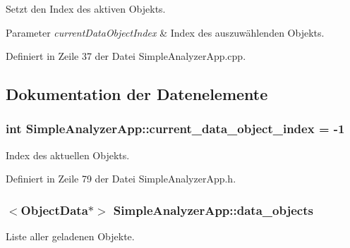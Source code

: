 Setzt den Index des aktiven Objekts. 


\begin{DoxyParams}{Parameter}
{\em current\-Data\-Object\-Index} & Index des auszuwählenden Objekts. \\
\hline
\end{DoxyParams}


Definiert in Zeile 37 der Datei Simple\-Analyzer\-App.\-cpp.



\subsection{Dokumentation der Datenelemente}
\hypertarget{classSimpleAnalyzerApp_a79ee2f69d43e2a32ba3c33c2560966e2}{
\subsubsection[{current\-\_\-data\-\_\-object\-\_\-index}]{\setlength{\rightskip}{0pt plus 5cm}int Simple\-Analyzer\-App\-::current\-\_\-data\-\_\-object\-\_\-index = -\/1\hspace{0.3cm}{\ttfamily [private]}}}\label{classSimpleAnalyzerApp_a79ee2f69d43e2a32ba3c33c2560966e2}


Index des aktuellen Objekts. 



Definiert in Zeile 79 der Datei Simple\-Analyzer\-App.\-h.

\hypertarget{classSimpleAnalyzerApp_a99bb49d6e0ec4d6f03ad08c29cf63288}{
\subsubsection[{data\-\_\-objects}]{$<${\bf Object\-Data}$\ast$$>$ Simple\-Analyzer\-App\-::data\-\_\-objects\hspace{0.3cm}{\ttfamily [private]}}}\label{classSimpleAnalyzerApp_a99bb49d6e0ec4d6f03ad08c29cf63288}


Liste aller geladenen Objekte. 



